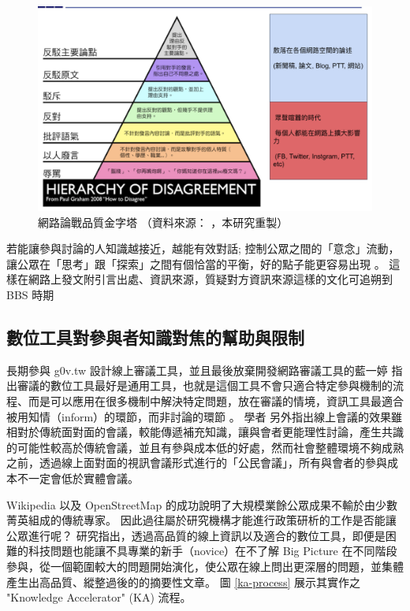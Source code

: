 \documentclass[12pt,a4paper]{article}
\begin{document}
\begin{figure}[htbp]
\centering
\includegraphics[width=.9\linewidth]{./images/how-to-disagree.png}
\caption{\label{fig:how-to-disagree}
網路論戰品質金字塔 （資料來源： \cite{zhu_2015} ，本研究重製）}
\end{figure}

若能讓參與討論的人知識越接近，越能有效對話; 控制公眾之間的「意念」流動，讓公眾在「思考」跟「探索」之間有個恰當的平衡，好的點子能更容易出現 \citep*{pentland14_shu}。 這樣在網路上發文附引言出處、資訊來源，質疑對方資訊來源這樣的文化可追朔到 BBS 時期 \citep*{malaita15}

\subsection{數位工具對參與者知識對焦的幫助與限制}
\label{sec:org7ae1ce6}
長期參與 g0v.tw 設計線上審議工具，並且最後放棄開發網路審議工具的藍一婷
指出審議的數位工具最好是通用工具，也就是這個工具不會只適合特定參與機制的流程、而是可以應用在很多機制中解決特定問題，放在審議的情境，資訊工具最適合被用知情（inform）的環節，而非討論的環節 \citep{etblue18,etblue2017}。 學者 \citep*{chen08} 另外指出線上會議的效果雖相對於傳統面對面的會議，較能傳遞補充知識，讓與會者更能理性討論，產生共識的可能性較高於傳統會議，並且有參與成本低的好處，然而社會整體環境不夠成熟之前，透過線上面對面的視訊會議形式進行的「公民會議」，所有與會者的參與成本不一定會低於實體會議。

Wikipedia 以及 OpenStreetMap 的成功說明了大規模業餘公眾成果不輸於由少數菁英組成的傳統專家。
因此過往屬於研究機構才能進行政策研析的工作是否能讓公眾進行呢？ \citep*{hahn16} 研究指出，透過高品質的線上資訊以及適合的數位工具，即便是困難的科技問題也能讓不具專業的新手（novice）在不了解 Big Picture 在不同階段參與，從一個範圍較大的問題開始演化，使公眾在線上問出更深層的問題，並集體產生出高品質、縱整過後的的摘要性文章。 圖 \ref{ka-process} 展示其實作之 "Knowledge Accelerator" (KA) 流程。
\end{document}
